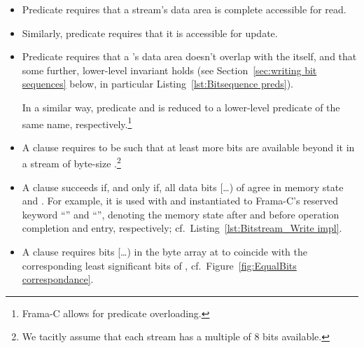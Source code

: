 \begin{itemize}
\item Predicate  requires that a stream's data area is
	complete accessible for read.
\item Similarly, predicate  requires that it is
	accessible for update.

\item Predicate  requires that a 
	's data area
	doesn't overlap with the  itself, and that some
	further, lower-level invariant holds (see 
	Section~\ref{sec:writing bit sequences} below, in particular
	Listing~\ref{lst:Bitsequence preds}).

	In a similar way, predicate  and
	 is reduced to a
	lower-level predicate of the same 
	name, 
	respectively.\footnote{Frama-C allows for predicate overloading.}

\item
	A clause  requires
	 to be such that at least 
	more bits are available beyond it in a stream of byte-size
	.\footnote{
		We tacitly assume that each stream has a multiple of 8 bits
		available.
	}

\item
	A clause
	 succeeds if,
	and only if, 
	all data bits [\ldots{})
	of  agree in memory state  and
	.
	For example, it is used with  and 
	instantiated to Frama-C's reserved keyword ``'' and
	``'', denoting the memory state after and before
	operation completion and entry, respectively; cf.\
	Listing~\ref{lst:Bitstream_Write impl}.

\item
	A clause  requires 
	bits [\ldots{}) in
	the byte array at  to coincide with the
	corresponding least significant bits of ,
	cf.~Figure~\ref{fig:EqualBits correspondance}.
\end{itemize}


